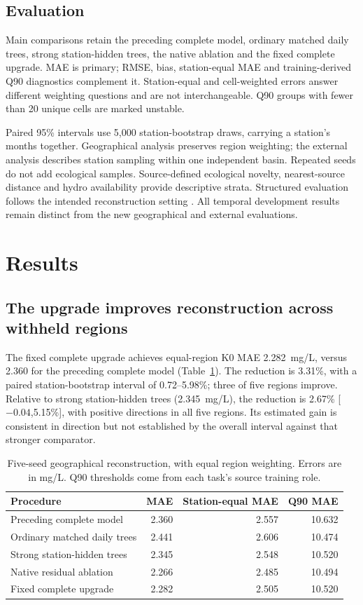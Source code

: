 \documentclass[11pt]{article}
\begin{document}
\subsection{Evaluation}
Main comparisons retain the preceding complete model, ordinary matched daily trees, strong station-hidden trees, the native ablation and the fixed complete upgrade. MAE is primary; RMSE, bias, station-equal MAE and training-derived Q90 diagnostics complement it. Station-equal and cell-weighted errors answer different weighting questions and are not interchangeable. Q90 groups with fewer than 20 unique cells are marked unstable.

Paired 95\% intervals use 5,000 station-bootstrap draws, carrying a station's months together. Geographical analysis preserves region weighting; the external analysis describes station sampling within one independent basin. Repeated seeds do not add ecological samples. Source-defined ecological novelty, nearest-source distance and hydro availability provide descriptive strata. Structured evaluation follows the intended reconstruction setting \citep{roberts2017}. All temporal development results remain distinct from the new geographical and external evaluations.

\FloatBarrier
\section{Results}
\subsection{The upgrade improves reconstruction across withheld regions}
The fixed complete upgrade achieves equal-region K0 MAE 2.282~mg/L, versus 2.360 for the preceding complete model (Table~\ref{tab:geo}). The reduction is 3.31\%, with a paired station-bootstrap interval of 0.72--5.98\%; three of five regions improve. Relative to strong station-hidden trees (2.345~mg/L), the reduction is 2.67\% [$-0.04$,5.15\%], with positive directions in all five regions. Its estimated gain is consistent in direction but not established by the overall interval against that stronger comparator.

\begin{table}[htbp]\centering\small
\caption{Five-seed geographical reconstruction, with equal region weighting. Errors are in mg/L. Q90 thresholds come from each task's source training role.}
\label{tab:geo}
\begin{tabular}{lrrr}\toprule
Procedure & MAE & Station-equal MAE & Q90 MAE\\\midrule
Preceding complete model &2.360&2.557&10.632\\
Ordinary matched daily trees &2.441&2.606&10.474\\
Strong station-hidden trees &2.345&2.548&10.520\\
Native residual ablation &2.266&2.485&10.494\\
Fixed complete upgrade &2.282&2.505&10.520\\\bottomrule
\end{tabular}
\end{table}
\end{document}

